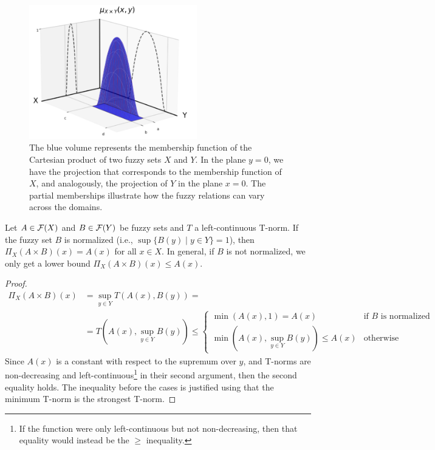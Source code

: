   \begin{figure}[ht]
      \centering
      \includegraphics[width=0.65\textwidth]{ch1/figures/fuzzy_cart_prod.png}
      \caption{The blue volume represents the membership function of the Cartesian product of two fuzzy sets $X$ and $Y$. In the plane $y=0$, we have the projection that corresponds to the membership function of $X$, and analogously, the projection of $Y$ in the plane $x=0$. The partial memberships illustrate how the fuzzy relations can vary across the domains.}
      \label{fig:fuzzy_cart_prod}
  \end{figure}



\begin{proposition}
  Let $A \in \mathcal{F}(X)$ and $B \in \mathcal{F}(Y)$ be fuzzy sets and $T$ a left-continuous T-norm. If the fuzzy set $B$ is normalized (i.e., $\sup\{B(y) \mid y \in Y\}  = 1$), then $\Pi_X(A \times B)(x) = A(x)$ for all $x \in X$. 
  In general, if $B$ is not normalized, we only get a lower bound $\Pi_X(A \times B)(x) \le A(x)$.
  \end{proposition}
  
  \begin{proof}
  \begin{equation*}
    \begin{split}
      \Pi_X(A \times B)(x) &= \sup_{y \in Y} T(A(x), B(y))= \\
      &= T(A(x), \sup_{y \in Y} B(y)) \leq
      \begin{cases}
        \min(A(x), 1) = A(x) & \text{if } B \text{ is normalized}\\
        \min(A(x), \sup_{y \in Y} B(y)) \leq A(x) & \text{otherwise}
      \end{cases}
    \end{split}
  \end{equation*}
  Since $A(x)$ is a constant with respect to the supremum over $y$, and T-norms are non-decreasing and left-continuous\footnote{If the function were only left-continuous but not non-decreasing, then that equality would instead be the $\geq$ inequality.} in their second argument, then the second equality holds. The inequality before the cases is justified using that the minimum T-norm is the strongest T-norm.
  \end{proof}
  
